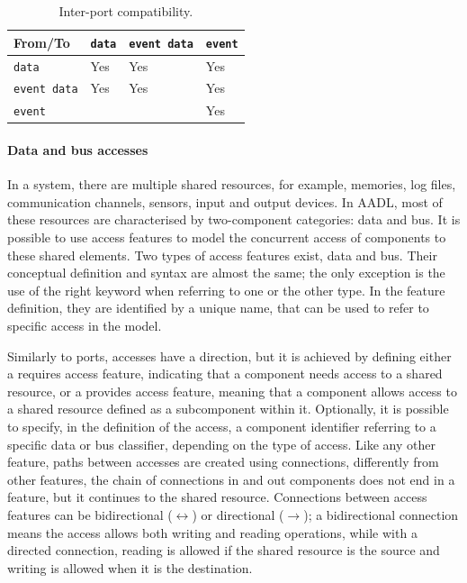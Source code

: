 \begin{table}
    \myfloatalign
    \begin{tabularx}{\textwidth}{X X X X}
        \toprule
        From/To  & \texttt{data} & \texttt{event data} & \texttt{event}   \\
        \midrule
        \texttt{data}  & Yes & Yes & Yes   \\
        \texttt{event data}  & Yes & Yes & Yes   \\
        \texttt{event}  &  &  & Yes   \\
        \bottomrule
    \end{tabularx}
    \caption[Inter-port compatibility]{Inter-port compatibility.}  \label{tab:ports}
\end{table}

\paragraph{Data and bus accesses}
In a system, there are multiple shared resources, for example, memories, log files, communication channels, sensors, input and output devices. In AADL, most of these resources are characterised by two-component categories: data and bus. It is possible to use access features to model the concurrent access of components to these shared elements. Two types of access features exist, data and bus. Their conceptual definition and syntax are almost the same; the only exception is the use of the right keyword when referring to one or the other type. In the feature definition, they are identified by a unique name, that can be used to refer to specific access in the model.

Similarly to ports, accesses have a direction, but it is achieved by defining either a requires access feature, indicating that a component needs access to a shared resource, or a provides access feature, meaning that a component allows access to a shared resource defined as a subcomponent within it. Optionally, it is possible to specify, in the definition of the access, a component identifier referring to a specific data or bus classifier, depending on the type of access. Like any other feature, paths between accesses are created using connections, differently from other features, the chain of connections in and out components does not end in a feature, but it continues to the shared resource. Connections between access features can be bidirectional ($\leftrightarrow$) or directional ($\rightarrow$); a bidirectional connection means the access allows both writing and reading operations, while with a directed connection, reading is allowed if the shared resource is the source and writing is allowed when it is the destination.

